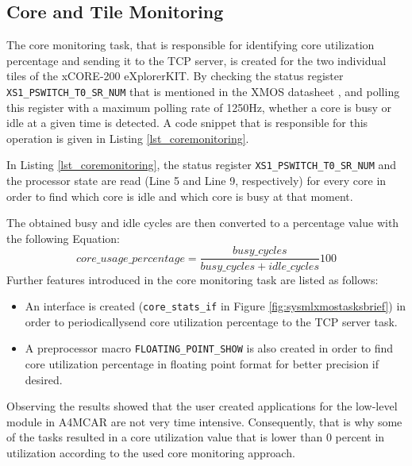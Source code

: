 \subsection{Core and Tile Monitoring}\label{coremonitoringsection}
The core monitoring task, that is responsible for identifying core utilization percentage and sending it to the TCP server, is created for the two individual tiles of the xCORE-200 eXplorerKIT. By checking the status register \texttt{XS1\texttt{\_}PSWITCH\texttt{\_}T0\texttt{\_}SR\texttt{\_}NUM} that is mentioned in the XMOS datasheet \cite{xmosdatasheet}, and polling this register with a maximum polling rate of 1250Hz, whether a core is busy or idle at a given time is detected. A code snippet that is responsible for this operation is given in Listing \ref{lst_coremonitoring}. 



In Listing \ref{lst_coremonitoring}, the status register \texttt{XS1\texttt{\_}PSWITCH\texttt{\_}T0\texttt{\_}SR\texttt{\_}NUM} and the processor state are read (Line 5 and Line 9, respectively) for every core in order to find which core is idle and which core is busy at that moment. 

The obtained busy and idle cycles are then converted to a percentage value with the following Equation:
\begin{equation}
core\texttt{\_}usage\texttt{\_}percentage=\frac{busy\texttt{\_}cycles}{busy\texttt{\_}cycles + idle\texttt{\_}cycles} 100
\end{equation}
Further features introduced in the core monitoring task are listed as follows:
\begin{itemize}
	\item An interface is created (\texttt{core\texttt{\_}stats\texttt{\_}if} in Figure \ref{fig:sysmlxmostasksbrief}) in order to periodicallysend core utilization percentage to the TCP server task. 
	\item A preprocessor macro \texttt{FLOATING\texttt{\_}POINT\texttt{\_}SHOW} is also created in order to find core utilization percentage in floating point format for better precision if desired.
\end{itemize}

Observing the results showed that the user created applications for the low-level module in A4MCAR are not very time intensive. Consequently, that is why some of the tasks resulted in a core utilization value that is lower than 0 percent in utilization according to the used core monitoring approach.

